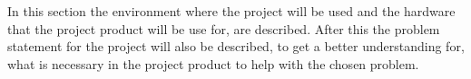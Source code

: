 In this section the environment where the project will be used and the hardware that the project product will be use for, are described. After this the problem statement for the project will also be described, to get a better understanding for, what is necessary in the project product to help with the chosen problem.